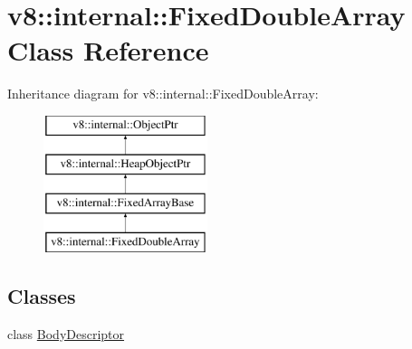 \hypertarget{classv8_1_1internal_1_1FixedDoubleArray}{}\section{v8\+:\+:internal\+:\+:Fixed\+Double\+Array Class Reference}
\label{classv8_1_1internal_1_1FixedDoubleArray}
Inheritance diagram for v8\+:\+:internal\+:\+:Fixed\+Double\+Array\+:\begin{figure}[H]
\begin{center}
\leavevmode
\includegraphics[height=4.000000cm]{classv8_1_1internal_1_1FixedDoubleArray}
\end{center}
\end{figure}
\subsection*{Classes}
\begin{DoxyCompactItemize}
\item 
class \mbox{\hyperlink{classv8_1_1internal_1_1FixedDoubleArray_1_1BodyDescriptor}{Body\+Descriptor}}
\end{DoxyCompactItemize}
